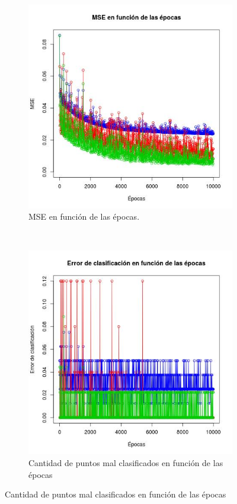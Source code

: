 \documentclass[12pt, a4paper]{article}
\begin{document}
\begin{figure}
    \centering

~ %
    \begin{subfigure}[b]{0.45\textwidth}
        \includegraphics[width=\textwidth]{iris2}
        \caption{MSE en función de las épocas.}  
    \end{subfigure}
      ~ %
    \begin{subfigure}[b]{0.45\textwidth}
        \includegraphics[width=\textwidth]{iris2Porcentual}
        \caption{Cantidad de puntos mal clasificados en función de las épocas}  
    \end{subfigure}


\end{figure}
\end{document}
